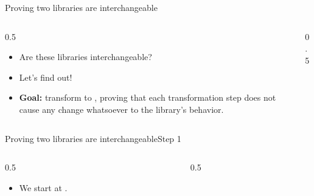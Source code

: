 \ifdefined\PRESENTATION\else\PassOptionsToClass{handout}{beamer}\fi\documentclass[aspectratio=169, lualatex]{beamer}
\begin{document}
\begin{frame}{Proving two libraries are interchangeable}
	\begin{columns}[c]
		\begin{column}{0.5\textwidth}
			\begin{itemize}[<+->]
				\item Are these libraries interchangeable?
				\item Let's find out!
				\item \textbf{Goal:} transform  to , proving that each transformation step does not cause any change whatsoever to the library's behavior.
			\end{itemize}
		\end{column}
		\begin{column}{0.5\textwidth}
			\begin{flushright}
			\end{flushright}
		\end{column}
	\end{columns}
\end{frame}

\begin{frame}{Proving two libraries are interchangeable}{Step 1}
	\begin{columns}[c]
		\begin{column}{0.5\textwidth}
			\begin{itemize}
				\item We start at .
			\end{itemize}
		\end{column}
		\begin{column}{0.5\textwidth}
			\begin{center}
			\end{center}
		\end{column}
	\end{columns}
\end{frame}
\end{document}

